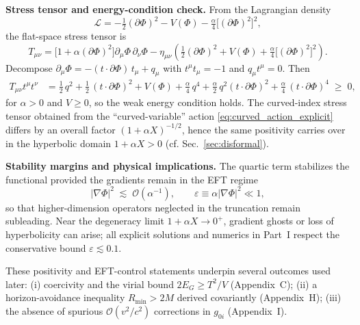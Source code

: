 \documentclass{article}
\begin{document}
\medskip
\noindent\textbf{Stress tensor and energy-condition check.}
From the Lagrangian density
\begin{equation}
\mathcal{L} = -\tfrac12(\partial\Phi)^2 - V(\Phi) - \tfrac{\alpha}{4}\big[(\partial\Phi)^2\big]^2,
\label{eq:lagrangian_energy}
\end{equation}
the flat-space stress tensor is
\begin{equation}
T_{\mu\nu} = \Big[1+\alpha(\partial\Phi)^2\Big]\partial_\mu\Phi\,\partial_\nu\Phi
- \eta_{\mu\nu}\left(\tfrac12 (\partial\Phi)^2 + V(\Phi) + \tfrac{\alpha}{4}\big[(\partial\Phi)^2\big]^2\right).
\label{eq:stress_flat_quartic}
\end{equation}
Decompose $\partial_\mu\Phi = -(t\!\cdot\!\partial\Phi)\,t_\mu + q_\mu$ with $t^\mu t_\mu=-1$ and $q_\mu t^\mu=0$. Then
\begin{align}
T_{\mu\nu}t^\mu t^\nu 
&= \tfrac12\,q^2 + \tfrac12\,(t\!\cdot\!\partial\Phi)^2 + V(\Phi)
+ \tfrac{\alpha}{4}\,q^4 + \tfrac{\alpha}{2}\,q^2 (t\!\cdot\!\partial\Phi)^2 + \tfrac{\alpha}{4}\,(t\!\cdot\!\partial\Phi)^4 \;\ge\;0,
\label{eq:WEC_flat}
\end{align}
for $\alpha>0$ and $V\!\ge\!0$, so the weak energy condition holds. The curved-index stress tensor obtained from the “curved-variable” action \eqref{eq:curved_action_explicit} differs by an overall factor $(1+\alpha X)^{-1/2}$, hence the same positivity carries over in the hyperbolic domain $1+\alpha X>0$ (cf. Sec.~\ref{sec:disformal}).

\medskip
\noindent\textbf{Stability margins and physical implications.}
The quartic term stabilizes the functional provided the gradients remain in the EFT regime
\begin{equation}
|\nabla\Phi|^2 \;\lesssim\; \mathcal{O}(\alpha^{-1}),
\qquad
\varepsilon \equiv \alpha|\nabla\Phi|^2 \ll 1,
\label{eq:EFT_regime}
\end{equation}
so that higher-dimension operators neglected in the truncation remain subleading. Near the degeneracy limit $1+\alpha X\to 0^+$, gradient ghosts or loss of hyperbolicity can arise; all explicit solutions and numerics in Part~I respect the conservative bound $\varepsilon \lesssim 0.1$.

These positivity and EFT-control statements underpin several outcomes used later:
(i) coercivity and the virial bound $2E_G \ge T^2/V$ (Appendix~C);
(ii) a horizon-avoidance inequality $R_{\min} > 2M$ derived covariantly (Appendix~H);
(iii) the absence of spurious $\mathcal{O}(v^2/c^2)$ corrections in $g_{0i}$ (Appendix~I).
\end{document}
